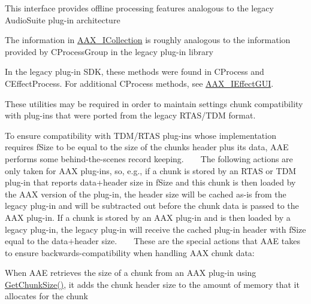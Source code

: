 \begin{DoxyRefList}
%
 This interface provides offline processing features analogous to the legacy Audio\+Suite plug-\/in architecture 
\item[Class \mbox{\hyperlink{a01777}{A\+A\+X\+\_\+\+I\+Collection}} ]\label{a00787__porting_notes000037}%
%
 The information in \mbox{\hyperlink{a01777}{A\+A\+X\+\_\+\+I\+Collection}} is roughly analogous to the information provided by C\+Process\+Group in the legacy plug-\/in library 
\item[Class \mbox{\hyperlink{a01825}{A\+A\+X\+\_\+\+I\+Effect\+Parameters}} ]\label{a00787__porting_notes000038}%
%
 In the legacy plug-\/in S\+DK, these methods were found in C\+Process and {\ttfamily C\+Effect\+Process}. For additional {\ttfamily C\+Process} methods, see \mbox{\hyperlink{a01821}{A\+A\+X\+\_\+\+I\+Effect\+G\+UI}}. 
\item[File \mbox{\hyperlink{a00674}{A\+A\+X\+\_\+\+Slider\+Conversions.h}} ]\label{a00787__porting_notes000059}%
%
 These utilities may be required in order to maintain settings chunk compatibility with plug-\/ins that were ported from the legacy R\+T\+A\+S/\+T\+DM format. 
\item[Class \mbox{\hyperlink{a01417}{A\+A\+X\+\_\+\+S\+Plug\+In\+Chunk\+Header}} ]\label{a00787__porting_notes000002}%
%
 To ensure compatibility with T\+D\+M/\+R\+T\+AS plug-\/ins whose implementation requires {\ttfamily f\+Size} to be equal to the size of the chunk\textquotesingle{}s header plus its data, A\+AE performs some behind-\/the-\/scenes record keeping. ~\newline
 ~\newline
 The following actions are only taken for A\+AX plug-\/ins, so, e.\+g., if a chunk is stored by an R\+T\+AS or T\+DM plug-\/in that reports data+header size in {\ttfamily f\+Size} and this chunk is then loaded by the A\+AX version of the plug-\/in, the header size will be cached as-\/is from the legacy plug-\/in and will be subtracted out before the chunk data is passed to the A\+AX plug-\/in. If a chunk is stored by an A\+AX plug-\/in and is then loaded by a legacy plug-\/in, the legacy plug-\/in will receive the cached plug-\/in header with {\ttfamily f\+Size} equal to the data+header size. ~\newline
 ~\newline
 These are the special actions that A\+AE takes to ensure backwards-\/compatibility when handling A\+AX chunk data\+:
\begin{DoxyItemize}
\item When A\+AE retrieves the size of a chunk from an A\+AX plug-\/in using \mbox{\hyperlink{a01669_aa986711cd372febcaae803e86ae08f63}{Get\+Chunk\+Size()}}, it adds the chunk header size to the amount of memory that it allocates for the chunk ~\newline


\end{DoxyItemize}
\end{DoxyRefList}
